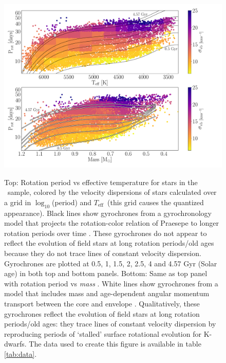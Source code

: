 \documentclass{aastex63}
\newcommand{\teff}{$T_{\mathrm{eff}}$}
\newcommand{\mct}{\citet{mcquillan2014}}
\begin{document}
\begin{figure}
  \caption{
    Top: Rotation period vs effective temperature for stars in the \mct\
    sample, colored by the velocity dispersions of stars calculated over a
    grid in $\log_{10}$(period) and \teff\ (this grid causes the quantized
    appearance).
    Black lines show gyrochrones from a gyrochronology model that projects the
    rotation-color relation of
    Praesepe to longer rotation periods over time \citep{angus2019}.
    These gyrochrones do not appear to reflect the evolution of field stars at
    long rotation periods/old ages because they do not trace lines of constant
    velocity dispersion.
    Gyrochrones are plotted at 0.5, 1, 1.5, 2, 2.5, 4 and 4.57 Gyr (Solar age)
    in both top and bottom panels.
    Bottom: Same as top panel with rotation period vs {\it mass}
    \citep[from][]{berger2020}.
    White lines show gyrochrones from a model that includes mass and
    age-dependent angular momentum transport between the core and envelope
    \citep{spada2019}.
    Qualitatively, these gyrochrones reflect the evolution of field
    stars at long rotation periods/old ages: they trace lines of constant
    velocity dispersion by reproducing periods of `stalled' surface rotational
    evolution for K-dwarfs.
    The data used to create this figure is available in table \ref{tab:data}.
}
  \centering
    \includegraphics[width=1\textwidth]{main_figure}
\label{fig:vplot}
\end{figure}
\end{document}
